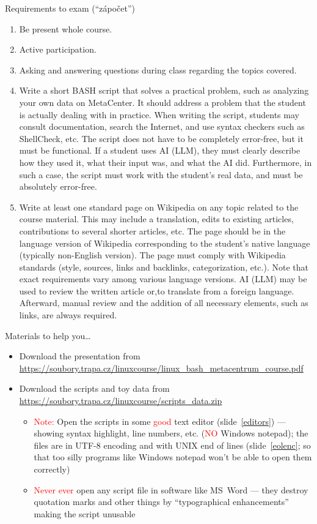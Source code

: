 \documentclass[compress, xelatex, 11pt, xcolor=svgnames, aspectratio=169, url={hyphens, lowtilde}]{beamer}
\renewcommand{\alert}[1]{\textcolor{red}{#1}}
\begin{document}
\begin{frame}[allowframebreaks]{Requirements to exam (\enquote{zápočet})}
	\begin{enumerate}
		\item Be present whole course.
		\item Active participation.
		\item Asking and answering questions during class regarding the topics covered.
		\item Write a short BASH script that solves a practical problem, such as analyzing your own data on MetaCenter. It should address a problem that the student is actually dealing with in practice. When writing the script, students may consult documentation, search the Internet, and use syntax checkers such as ShellCheck, etc. The script does not have to be completely error-free, but it must be functional. If a student uses AI (LLM), they must clearly describe how they used it, what their input was, and what the AI did. Furthermore, in such a case, the script must work with the student’s real data, and must be absolutely error-free.
		\item Write at least one standard page on Wikipedia on any topic related to the course material. This may include a translation, edits to existing articles, contributions to several shorter articles, etc. The page should be in the language version of Wikipedia corresponding to the student’s native language (typically non-English version). The page must comply with Wikipedia standards (style, sources, links and backlinks, categorization, etc.). Note that exact requirements vary among various language versions. AI (LLM) may be used to review the written article or,to translate from a foreign language. Afterward, manual review and the addition of all necessary elements, such as links, are always required.
	\end{enumerate}
\end{frame}

\begin{frame}{Materials to help you\ldots}
	\label{materials}
	\begin{itemize}
		\item Download the presentation from \url{https://soubory.trapa.cz/linuxcourse/linux_bash_metacentrum_course.pdf}
		\item Download the scripts and toy data from \url{https://soubory.trapa.cz/linuxcourse/scripts_data.zip}
		\begin{itemize}
			\item \alert{Note:} Open the scripts in some \alert{good} text editor (slide~\ref{editors}) --- showing syntax highlight, line numbers, etc. (\alert{NO} Windows notepad); the files are in UTF-8 encoding and with UNIX end of lines (slide~\ref{eolenc}; so that too silly programs like Windows notepad won't be able to open them correctly)
			\item \alert{Never ever} open any script file in software like MS~Word --- they destroy quotation marks and other things by \enquote{typographical enhancements} making the script unusable
		\end{itemize}
	\end{itemize}
\end{frame}
\end{document}
